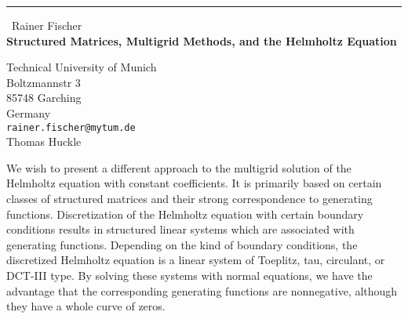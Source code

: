 \documentclass{report}
\begin{document}
\begin{center}
\rule{6in}{1pt} \
{\large Rainer Fischer \\
{\bf Structured Matrices, Multigrid Methods, and the Helmholtz Equation}}

Technical University of Munich \\ Boltzmannstr 3 \\ 85748 Garching \\ Germany
\\
{\tt rainer.fischer@mytum.de}\\
Thomas Huckle\end{center}

We wish to present a different approach to the multigrid solution of the
Helmholtz equation with constant coefficients. It is primarily based on
certain classes of structured matrices and their strong correspondence to
generating functions.
Discretization of the Helmholtz equation with certain boundary conditions
results in structured linear systems which are associated with generating
functions.
Depending on the kind of boundary conditions, the discretized Helmholtz
equation is a linear system of Toeplitz, tau, circulant, or DCT-III
type. By solving these systems with normal equations, we have the
advantage that the corresponding generating functions are nonnegative,
although they have a whole curve of zeros.
\end{document}

